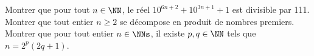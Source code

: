 %
%
	\begin{tasks}
		\task Montrer que pour tout $n\in \NN$, le réel $10^{6n+2}+10^{3n+1}+1$ est divisible par 111.
		\task Montrer que tout entier $n \ge 2$ se décompose en produit de nombres premiers.
		\task Montrer que pour tout entier $n \in \NNs$, il existe $p, q \in \NN$ tels que $n=2^p(2q+1)$.

	\end{tasks}
